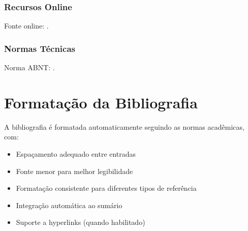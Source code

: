 \documentclass[mestrado]{UnB-PPGT}
\begin{document}
\subsection{Recursos Online}
Fonte online: \cite{who2021}.

\subsection{Normas Técnicas}
Norma ABNT: \cite{abnt2020}.

\chapter{Formatação da Bibliografia}

A bibliografia é formatada automaticamente seguindo as normas acadêmicas, com:

\begin{itemize}
\item Espaçamento adequado entre entradas
\item Fonte menor para melhor legibilidade
\item Formatação consistente para diferentes tipos de referência
\item Integração automática ao sumário
\item Suporte a hyperlinks (quando habilitado)
\end{itemize}

\postextual


\end{document}
